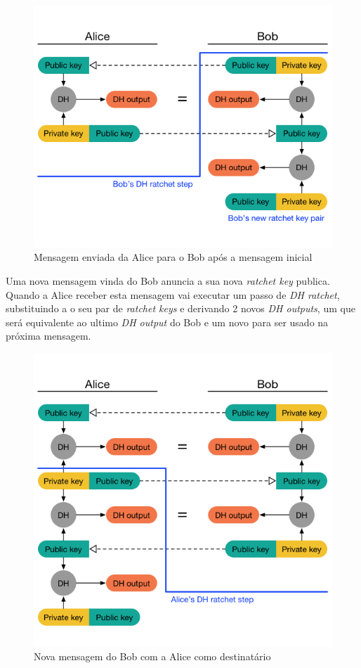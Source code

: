 \begin{figure}[H]
\begin{center}
\includegraphics[width=12cm]{img/DH2.png}
\caption{Mensagem enviada da Alice para o Bob após a mensagem inicial }
\label{diagram:DH2}
\centering
\end{center}
\end{figure}

Uma nova mensagem vinda do Bob anuncia a sua nova \textit{ratchet key} publica. Quando a Alice receber esta mensagem vai executar um passo de \textit{DH ratchet}, substituindo a o seu par de \textit{ratchet keys} e derivando 2 novos \textit{DH outputs}, um que será equivalente ao ultimo \textit{DH output} do Bob e um novo para ser usado na próxima mensagem.

\begin{figure}[H]
\begin{center}
\includegraphics[width=12cm]{img/DH3.png}
\caption{Nova mensagem do Bob com a Alice como destinatário}
\label{diagram:DH3}
\centering
\end{center}
\end{figure}

